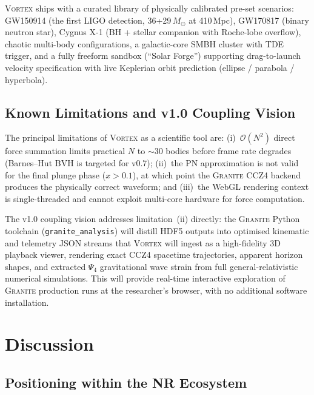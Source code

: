 \documentclass[aps,prd,twocolumn,superscriptaddress,nofootinbib,showpacs,
               longbibliography]{revtex4-2}
\newcommand{\granite}{\textsc{Granite}}
\newcommand{\code}[1]{\texttt{#1}}
\newcommand{\order}[1]{\mathcal{O}(#1)}
\begin{document}
\textsc{Vortex} ships with a curated library of physically calibrated
pre-set scenarios:
GW150914 (the first LIGO detection, 36+29\,$M_\odot$ at 410\,Mpc),
GW170817 (binary neutron star),
Cygnus X-1 (BH + stellar companion with Roche-lobe overflow),
chaotic multi-body configurations, a galactic-core SMBH cluster with
TDE trigger, and a fully freeform sandbox (``Solar Forge'') supporting
drag-to-launch velocity specification with live Keplerian orbit
prediction (ellipse / parabola / hyperbola).

\subsection{Known Limitations and v1.0 Coupling Vision}
\label{sec:vortex_limits}

The principal limitations of \textsc{Vortex} as a scientific tool are:
(i)~$\order{N^2}$ direct force summation limits practical $N$ to
${\sim}30$ bodies before frame rate degrades (Barnes--Hut BVH is
targeted for v0.7);
(ii)~the PN approximation is not valid for the final plunge phase
($x > 0.1$), at which point the \granite{} CCZ4 backend produces
the physically correct waveform;
and (iii)~the WebGL rendering context is single-threaded and cannot
exploit multi-core hardware for force computation.

The v1.0 coupling vision addresses limitation~(ii) directly: the
\granite{} Python toolchain (\code{granite\_analysis}) will distill HDF5
outputs into optimised kinematic and telemetry JSON streams that
\textsc{Vortex} will ingest as a high-fidelity 3D playback viewer,
rendering exact CCZ4 spacetime trajectories, apparent horizon shapes,
and extracted $\Psi_4$ gravitational wave strain from full general-relativistic
numerical simulations.
This will provide real-time interactive exploration of \granite{} production
runs at the researcher's browser, with no additional software installation.

\section{Discussion}
\label{sec:discussion}

\subsection{Positioning within the NR Ecosystem}
\end{document}
